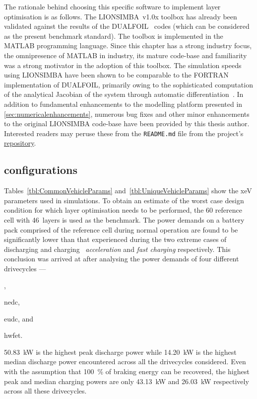 The  rationale  behind  choosing  this  specific  software  to  implement  layer
optimisation  is  as  follows.  The LIONSIMBA~v1.0x  toolbox  has  already  been
validated against  the results of the  DUALFOIL~\cite{Dualfoil1998} codes (which
can be considered as the present benchmark standard). The toolbox is implemented
in the  MATLAB programming language.  Since this  chapter has a  strong industry
focus,  the  omnipresence  of  MATLAB  in industry,  its  mature  code-base  and
familiarity  was  a strong  motivator  in  the  adoption  of this  toolbox.  The
simulation  speeds using  LIONSIMBA  have been  shown to  be  comparable to  the
FORTRAN  implementation  of  DUALFOIL,  primarily  owing  to  the  sophisticated
computation  of  the  analytical  Jacobian   of  the  system  through  automatic
differentiation~\cite{Torchio2016}.  In  addition  to  fundamental  enhancements
to  the   modelling  platform  presented   in  \cref{sec:numericalenhancements},
numerous  bug fixes  and  other  minor enhancements  to  the original  LIONSIMBA
code-base  have  been  provided  by   this  thesis  author.  Interested  readers
may  peruse   these  from  the   \texttt{README.md}  file  from   the  project's
\href{https://github.com/lionsimbatoolbox/LIONSIMBA}{repository}.

\subsection{ configurations}



Tables~\ref{tbl:CommonVehicleParams} and~\ref{tbl:UniqueVehicleParams}  show the
\gls{xeV}  parameters used  in simulations.  To obtain an estimate of the worst
case design condition for which layer optimisation needs to be performed, the
\SI{60}{\amphour} reference cell with 46~layers is used as the benchmark. The
power demands  on a  battery
pack  comprised of the reference cell during  normal  operation  are   found  to
be  significantly  lower  than that  experienced during  the  two  extreme cases
of  discharging and  charging \viz~\emph{acceleration} and \emph{fast  charging}
respectively. This conclusion was arrived at after analysing the power demands
of four different drivecycles
---
\begin{enumerate*}[label=\itshape\alph*\upshape)]
    \item {},
    \item \gls{nedc},
    \item \gls{eudc}, and
    \item \gls{hwfet}.
\end{enumerate*}
\SI{50.83}{\kilo\watt} is the highest peak  discharge power while
\SI{14.20}{\kilo\watt} is  the highest median  discharge power encountered
across all the drivecycles considered. Even  with the  assumption that
\SI{100}{\percent}  of braking  energy  can be  recovered, the  highest peak
and  median  charging  powers  are  only  \SI{43.13}{\kilo\watt}  and
\SI{26.03}{\kilo\watt}  respectively across all these drivecycles.


